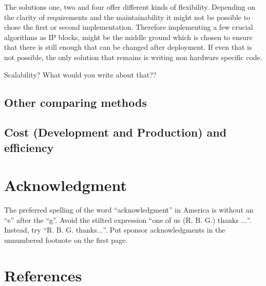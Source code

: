 \documentclass[conference]{IEEEtran}
\begin{document}
The solutions one, two and four offer different kinds of flexibility. Depending on the clarity of requirements and the maintainability it might not be possible to chose the first or second implementation. Therefore implementing a few crucial algorithms as IP blocks, might be the middle ground which is chosen to ensure that there is still enough that can be changed after deployment. If even that is not possible, the only solution that remains is writing non hardware specific code.

Scalability? What would you write about that??

\subsection{Other comparing methods}


\subsection{Cost (Development and Production) and efficiency}



\section*{Acknowledgment}

The preferred spelling of the word ``acknowledgment'' in America is without 
an ``e'' after the ``g''. Avoid the stilted expression ``one of us (R. B. 
G.) thanks $\ldots$''. Instead, try ``R. B. G. thanks$\ldots$''. Put sponsor 
acknowledgments in the unnumbered footnote on the first page.

\section*{References}

\printbibliography
\end{document}
